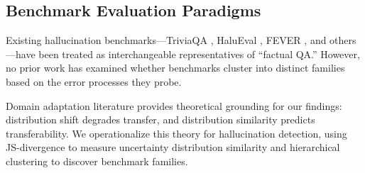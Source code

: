 \subsection{Benchmark Evaluation Paradigms}

Existing hallucination benchmarks---TriviaQA \cite{joshi2017triviaqa}, HaluEval \cite{li2023halueval}, FEVER \cite{thorne2018fever}, and others---have been treated as interchangeable representatives of ``factual QA.'' However, no prior work has examined whether benchmarks cluster into distinct families based on the error processes they probe.

Domain adaptation literature \cite{bendavid2010theory} provides theoretical grounding for our findings: distribution shift degrades transfer, and distribution similarity predicts transferability. We operationalize this theory for hallucination detection, using JS-divergence to measure uncertainty distribution similarity and hierarchical clustering to discover benchmark families.
